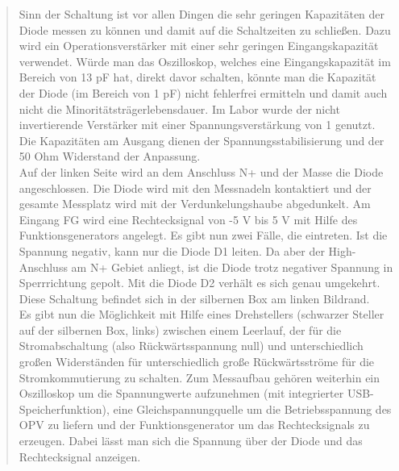 \begin{quote}
    Sinn der Schaltung ist vor allen Dingen die sehr geringen Kapazitäten der
    Diode messen zu können und damit auf die Schaltzeiten zu schließen. Dazu
    wird ein Operationsverstärker mit einer sehr geringen Eingangskapazität
    verwendet. Würde man das Oszilloskop, welches eine Eingangskapazität im
    Bereich von 13 pF hat, direkt davor schalten, könnte man die Kapazität der
    Diode (im Bereich von 1 pF) nicht fehlerfrei ermitteln und damit auch nicht
    die Minoritätsträgerlebensdauer. Im Labor wurde der nicht invertierende
    Verstärker mit einer Spannungsverstärkung von 1 genutzt. Die Kapazitäten am
    Ausgang dienen der Spannungsstabilisierung und der 50 Ohm Widerstand der
    Anpassung.  \\
    Auf der linken Seite wird an dem Anschluss N+ und der Masse die Diode
    angeschlossen. Die Diode wird mit den Messnadeln kontaktiert und der
    gesamte Messplatz wird mit der Verdunkelungshaube abgedunkelt. Am Eingang
    FG wird eine Rechtecksignal von -5 V bis 5 V mit
    Hilfe des Funktionsgenerators angelegt. Es gibt nun zwei Fälle, die
    eintreten. Ist die Spannung negativ, kann nur die Diode D1 leiten. Da aber
    der High-Anschluss am N+ Gebiet anliegt, ist die Diode trotz negativer
    Spannung in Sperrrichtung gepolt. Mit die Diode D2 verhält es sich genau
    umgekehrt.\\
    Diese Schaltung befindet sich in der silbernen Box am linken Bildrand.\\
    Es gibt nun die Möglichkeit mit Hilfe eines Drehstellers (schwarzer Steller
    auf der silbernen Box, links) zwischen einem Leerlauf, der für die
    Stromabschaltung (also Rückwärtsspannung null) und unterschiedlich großen
    Widerständen für unterschiedlich große Rückwärtsströme für die
    Stromkommutierung zu schalten. Zum Messaufbau gehören weiterhin ein
    Oszilloskop um die Spannungwerte aufzunehmen (mit integrierter USB-
    Speicherfunktion), eine Gleichspannungquelle um die Betriebsspannung des
    OPV zu liefern und der Funktionsgenerator um das Rechtecksignals zu
    erzeugen. Dabei lässt man sich die Spannung über der Diode und das
    Rechtecksignal anzeigen.
 
    \vspace{2em}


\end{quote}
